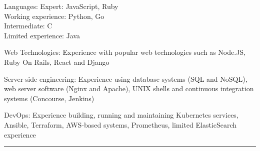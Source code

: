 \documentclass[11pt,a4paper]{article}
\newenvironment{indentsection}[1]%
{\begin{list}{}%
	{\setlength{\leftmargin}{#1}}%
	\item[]%
}
{\end{list}}
\begin{document}
\begin{indentsection}{\parindent}
\begin{description*}
	\item[Languages:]
    Expert: JavaScript, Ruby\\
    Working experience: Python, Go\\
    Intermediate: C\\
    Limited experience: Java
	\item[Web Technologies:]
	    Experience with popular web technologies such as Node.JS, Ruby On Rails, React and Django
	\item[Server-side engineering:]
	Experience using database systems (SQL and NoSQL), web server software (Nginx and Apache), UNIX shells and continuous integration systems (Concourse, Jenkins)
        \item[DevOps:] Experience building, running and maintaining Kubernetes services, Ansible, Terraform, AWS-based systems, Prometheus, limited ElasticSearch experience
\end{description*}
\end{indentsection}


\vspace{-0.4em}
\hrule
\vspace{-1.2em}
\end{document}
